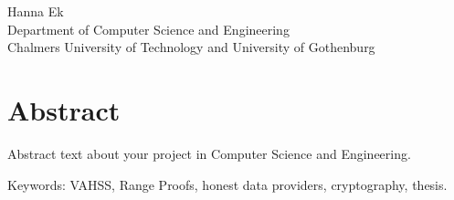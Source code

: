 \oneLineTitle\\
\oneLineSubtitle\\
Hanna Ek\\
Department of Computer Science and Engineering\\
Chalmers University of Technology and University of Gothenburg\setlength{\parskip}{0.5cm}

\thispagestyle{plain}			%
\setlength{\parskip}{0pt plus 1.0pt}
\section*{Abstract}
Abstract text about your project in  Computer Science and Engineering.

\vfill
Keywords: VAHSS, Range Proofs, honest data providers, cryptography,  thesis.

\newpage				%
\thispagestyle{empty}
\mbox{}